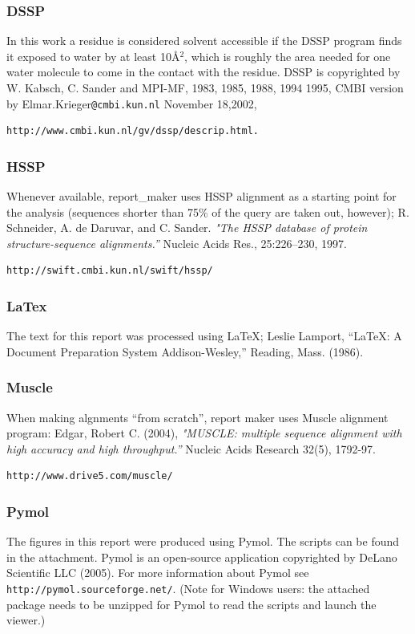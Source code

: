 %
\subsubsection{\bf DSSP}
 In this work a residue is considered solvent accessible if the 
 DSSP program
  finds it exposed to water by at least 10\AA$^2$, 
which is roughly the area  needed for one water molecule
to come in the contact with the residue.
DSSP is copyrighted by 
  W. Kabsch, C. Sander and MPI-MF, 1983, 1985, 1988, 1994 1995, 
  CMBI version by Elmar.Krieger{\tt @cmbi.kun.nl} November 18,2002,
\begin{verbatim}http://www.cmbi.kun.nl/gv/dssp/descrip.html.\end{verbatim}
%
\subsubsection{\bf HSSP}
 Whenever available, report\_maker uses HSSP alignment as a starting point for the analysis
(sequences shorter than 75\% of the query are taken out, however); 
R. Schneider, A. de Daruvar, and C. Sander. 
\emph {"The HSSP database of protein structure-sequence alignments.''} Nucleic Acids Res., 25:226--230, 1997.
\begin{verbatim}http://swift.cmbi.kun.nl/swift/hssp/\end{verbatim}
%
\subsubsection{\bf LaTex}
The text for this report was processed using \LaTeX;
 Leslie Lamport, ``LaTeX: A Document Preparation System
Addison-Wesley,'' Reading, Mass. (1986).
%
\subsubsection{\bf Muscle}
When making algnments ``from scratch'', report maker uses Muscle  alignment program:
Edgar, Robert C. (2004), 
\emph {"MUSCLE: multiple sequence alignment with high accuracy and high throughput.''}
Nucleic Acids Research 32(5), 1792-97.
\begin{verbatim}http://www.drive5.com/muscle/\end{verbatim}
%
\subsubsection{\bf Pymol}
The figures in this report were produced using Pymol. The scripts can be found in the 
attachment. Pymol is an open-source application copyrighted by DeLano Scientific LLC (2005).
 For more information about Pymol see {\tt http://pymol.sourceforge.net/}.
{\small(Note for Windows users: the attached package needs to be unzipped for Pymol
to read the scripts and launch the viewer.)}

